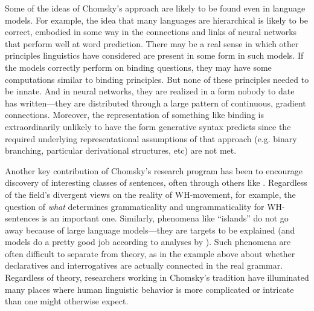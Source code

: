 \documentclass[output=paper,colorlinks,citecolor=brown
]{langscibook}
\begin{document}
Some of the ideas of Chomsky's approach are likely to be found even in language models. For example, the idea that many languages are hierarchical is likely to be correct, embodied in some way in the connections and links of neural networks that perform well at word prediction.  There may be a real sense in which other principles linguistics have considered are present in some form in such models. If the models correctly perform on binding questions, they may have some computations similar to binding principles. But  none of these principles needed to be innate. And in neural networks, they are realized in a form nobody to date has written---they are distributed through a large pattern of continuous, gradient connections. Moreover, the representation of something like binding is extraordinarily unlikely to have the form generative syntax predicts since the required underlying representational assumptions of that approach (e.g. binary branching, particular derivational structures, etc) are not met. 


Another key contribution of Chomsky's research program has been to encourage discovery of interesting classes of sentences, often through others like \cite{ross1967constraints}. Regardless of the field's divergent views on the reality of WH-movement, for example, the question of \emph{what} determines grammaticality and ungrammaticality for WH-sentences is an important one. Similarly,  phenomena like ``islands'' do not go away because of large language models---they are targets to be explained (and models do a pretty good job according to analyses by \cite{wilcox2022using}). Such phenomena are often difficult to separate from theory, as in the example above about whether declaratives and interrogatives are actually connected in the real grammar. Regardless of theory, researchers working in Chomsky's tradition have illuminated many places where human linguistic behavior is more complicated or intricate than one might otherwise expect.
\end{document}
